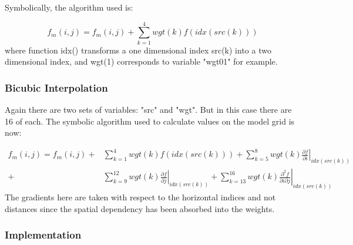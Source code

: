Symbolically, the algorithm used is:

\begin{equation}
f_{m}(i,j) = f_{m}(i,j) + \sum_{k=1}^{4} {wgt(k)f(idx(src(k)))}
\end{equation}
where function idx() transforms a one dimensional index src(k) into a two dimensional index,
and wgt(1) corresponds to variable "wgt01" for example.

\subsubsection{Bicubic Interpolation}
\label{SBC_iof_bicubic}

Again there are two sets of variables: "src" and "wgt".
But in this case there are 16 of each.
The symbolic algorithm used to calculate values on the model grid is now:

\begin{equation*} \begin{split}
f_{m}(i,j) =  f_{m}(i,j) +& \sum_{k=1}^{4} {wgt(k)f(idx(src(k)))}     
              +   \sum_{k=5}^{8} {wgt(k)\left.\frac{\partial f}{\partial i}\right| _{idx(src(k))} }    \\
              +& \sum_{k=9}^{12} {wgt(k)\left.\frac{\partial f}{\partial j}\right| _{idx(src(k))} }   
              +   \sum_{k=13}^{16} {wgt(k)\left.\frac{\partial ^2 f}{\partial i \partial j}\right| _{idx(src(k))} }
\end{split}
\end{equation*}
The gradients here are taken with respect to the horizontal indices and not distances since the spatial dependency has been absorbed into the weights.

\subsubsection{Implementation}
\label{SBC_iof_imp}

